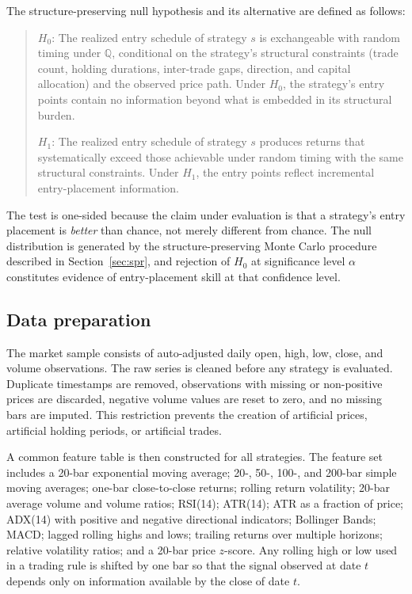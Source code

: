 \documentclass[preprint,12pt]{elsarticle}
\theoremstyle{definition}
\begin{document}
The structure-preserving null hypothesis and its alternative are defined as follows:
\begin{quote}
$H_0$: The realized entry schedule of strategy $s$ is exchangeable with random timing under $\mathbb{Q}$, conditional on the strategy's structural constraints (trade count, holding durations, inter-trade gaps, direction, and capital allocation) and the observed price path. Under $H_0$, the strategy's entry points contain no information beyond what is embedded in its structural burden.

\medskip

$H_1$: The realized entry schedule of strategy $s$ produces returns that systematically exceed those achievable under random timing with the same structural constraints. Under $H_1$, the entry points reflect incremental entry-placement information.
\end{quote}

The test is one-sided because the claim under evaluation is that a strategy's entry placement is \emph{better} than chance, not merely different from chance. The null distribution is generated by the structure-preserving Monte Carlo procedure described in Section~\ref{sec:spr}, and rejection of $H_0$ at significance level $\alpha$ constitutes evidence of entry-placement skill at that confidence level.

\subsection{Data preparation}

The market sample consists of auto-adjusted daily open, high, low, close, and volume observations. The raw series is cleaned before any strategy is evaluated. Duplicate timestamps are removed, observations with missing or non-positive prices are discarded, negative volume values are reset to zero, and no missing bars are imputed. This restriction prevents the creation of artificial prices, artificial holding periods, or artificial trades.

A common feature table is then constructed for all strategies. The feature set includes a 20-bar exponential moving average; 20-, 50-, 100-, and 200-bar simple moving averages; one-bar close-to-close returns; rolling return volatility; 20-bar average volume and volume ratios; RSI(14); ATR(14); ATR as a fraction of price; ADX(14) with positive and negative directional indicators; Bollinger Bands; MACD; lagged rolling highs and lows; trailing returns over multiple horizons; relative volatility ratios; and a 20-bar price $z$-score. Any rolling high or low used in a trading rule is shifted by one bar so that the signal observed at date $t$ depends only on information available by the close of date $t$.
\end{document}
